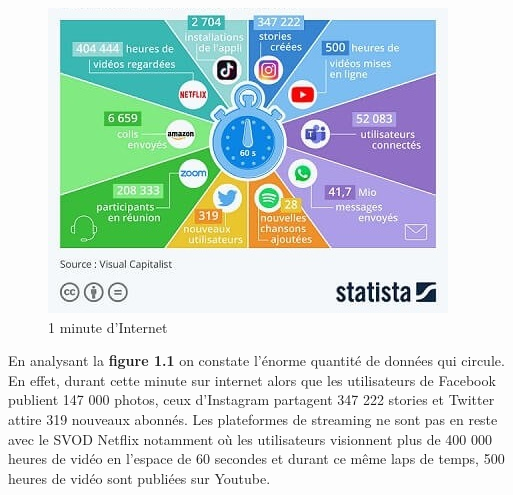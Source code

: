 \begin{figure}[h]
	\centering
    \includegraphics[scale=0.8]{img/part1/1.1}
    \caption{1 minute d'Internet}
\end{figure}

En analysant la \textbf{figure 1.1} on constate l'énorme quantité de données qui circule.  En effet, durant cette minute sur internet alors que les utilisateurs de Facebook publient 147 000 photos, ceux d'Instagram partagent 347 222 stories et Twitter attire 319 nouveaux abonnés. Les plateformes de streaming ne sont pas en reste avec le SVOD Netflix notamment où les utilisateurs visionnent plus de 400 000 heures de vidéo en l'espace de 60 secondes et durant ce même laps de temps, 500 heures de vidéo sont publiées sur Youtube.